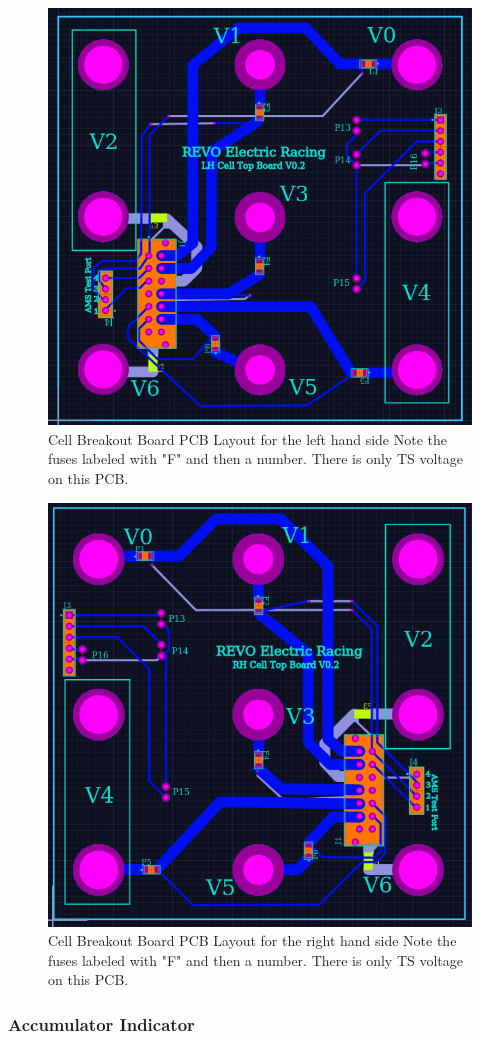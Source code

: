 \documentclass{article}
\begin{document}
            \begin{figure}[H]
                \centering
                \includegraphics[width = 0.4 \textwidth]{CellTopLH}
                \caption{Cell Breakout Board PCB Layout for the left hand side Note the fuses labeled with "F" and then a number. There is only TS voltage on this PCB.}
                \label{celltopLH}
            \end{figure}

            \begin{figure}[H]
                \centering
                \includegraphics[width = 0.4 \textwidth]{CellTopRH}
                \caption{Cell Breakout Board PCB Layout for the right hand side Note the fuses labeled with "F" and then a number. There is only TS voltage on this PCB.}
                \label{celltopRH}
            \end{figure}

        \subsubsection{Accumulator Indicator} \label{aindicator}

\end{document}
